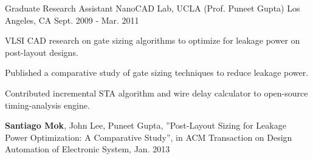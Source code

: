 \documentclass[12pt, letterpaper]{awesome-cv}
\begin{document}
\begin{cventries}

	\cventry
		{Graduate Research Assistant} %
		{NanoCAD Lab, UCLA (Prof. Puneet Gupta)} %
		{Los Angeles, CA} %
		{Sept. 2009 - Mar. 2011} %
		{ %
			\begin{cvitems}
				\item {VLSI CAD research on gate sizing algorithms to optimize for leakage power on post-layout designs.}
				\item {Published a comparative study of gate sizing techniques to reduce leakage power.}
				\item {Contributed incremental STA algorithm and wire delay calculator to open-source timing-analysis engine.}
			\end{cvitems}
		}

\end{cventries}


\begin{cvparagraph}
	\textbf{Santiago Mok}, John Lee, Puneet Gupta, ”Post-Layout Sizing for Leakage Power Optimization: A Comparative Study”, in ACM Transaction on Design Automation of Electronic System, Jan. 2013
\end{cvparagraph}
\end{document}

